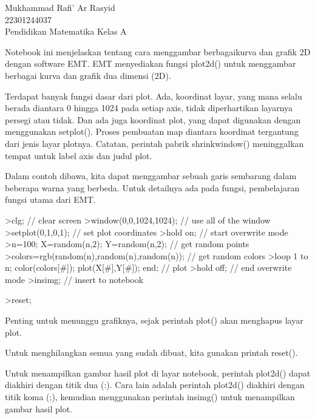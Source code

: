 \documentclass[a4paper,10pt]{article}
\begin{document}
\begin{eulernotebook}
\begin{eulercomment}
Mukhammad Rafi' Ar Rasyid\\
22301244037\\
Pendidikan Matematika Kelas A

\begin{eulercomment}
\begin{eulercomment}
Notebook ini menjelaskan tentang cara menggambar berbagaikurva dan
grafik 2D dengan software EMT. EMT menyediakan fungsi plot2d() untuk
menggambar berbagai kurva dan grafik dua dimensi (2D).\\
\end{eulercomment}
\begin{eulercomment}
Terdapat banyak fungsi dasar dari plot. Ada, koordinat layar, yang
mana selalu berada diantara 0 hingga 1024 pada setiap axis, tidak
diperhartikan layarnya persegi atau tidak. Dan ada juga koordinat
plot, yang dapat digunakan dengan menggunakan setplot(). Proses
pembuatan map diantara koordinat tergantung dari jenis layar plotnya.
Catatan, perintah pabrik shrinkwindow() meninggalkan tempat untuk
label axis dan judul plot.

Dalam contoh dibawa, kita dapat menggambar sebuah garis sembarang
dalam beberapa warna yang berbeda. Untuk detailnya ada pada fungsi,
pembelajaran fungsi utama dari EMT.
\end{eulercomment}
\begin{eulerprompt}
>clg; // clear screen
>window(0,0,1024,1024); // use all of the window
>setplot(0,1,0,1); // set plot coordinates
>hold on; // start overwrite mode
>n=100; X=random(n,2); Y=random(n,2);  // get random points
>colors=rgb(random(n),random(n),random(n)); // get random colors
>loop 1 to n; color(colors[#]); plot(X[#],Y[#]); end; // plot
>hold off; // end overwrite mode
>insimg; // insert to notebook
\end{eulerprompt}
\begin{eulerprompt}
>reset;
\end{eulerprompt}
\begin{eulercomment}
Penting untuk menunggu grafiknya, sejak perintah plot() akan menghapus
layar plot. 

Untuk menghilangkan semua yang sudah dibuat, kita gunakan printah
reset().

Untuk menampilkan gambar hasil plot di layar notebook, perintah
plot2d() dapat diakhiri dengan titik dua (:). Cara lain adalah
perintah plot2d() diakhiri dengan titik koma (;), kemudian menggunakan
perintah insimg() untuk menampilkan gambar hasil plot.


\end{eulercomment}
\end{eulercomment}
\end{eulercomment}
\end{eulernotebook}
\end{document}
